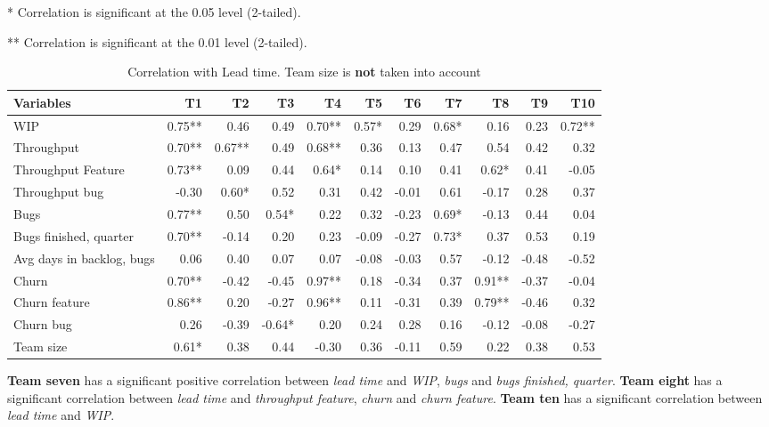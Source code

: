 \documentclass[UKenglish]{ifimaster}  %
\begin{document}
\begin{minipage}[t]{\linewidth}
\begin{table}[H]
 \caption{Correlation with Lead time.  Team size is \textbf{not} taken into account}
 \centerline {* Correlation is significant at the 0.05 level (2-tailed).}
\centerline{** Correlation is significant at the 0.01 level (2-tailed).}
 \begin{adjustwidth}{-1cm}{}
 \centering
 \begin{tabular}{|l|r|r|r|r|r|r|r|r|r|r|}
\hline
 \textbf{Variables} & \bf{T1} & \bf{T2} & \bf{T3} & \bf{T4} & \bf{T5} & \bf{T6} & \bf{T7} & \bf{T8} & \bf{T9} & \bf{T10}\\ \hline
 WIP  & 0.75** & 0.46 & 0.49 & 0.70** & 0.57* & 0.29 & 0.68* & 0.16 & 0.23 & 0.72** \\ \hline
 Throughput  & 0.70** & 0.67** & 0.49 & 0.68** & 0.36 & 0.13 & 0.47 & 0.54 & 0.42 & 0.32 \\ \hline
 Throughput Feature  & 0.73** & 0.09 & 0.44 & 0.64* & 0.14 & 0.10 & 0.41 & 0.62* & 0.41 & -0.05 \\ \hline
 Throughput bug  & -0.30 & 0.60* & 0.52 & 0.31 & 0.42 & -0.01 & 0.61 & -0.17 & 0.28 & 0.37 \\ \hline
 Bugs  & 0.77** & 0.50 & 0.54* & 0.22 & 0.32 & -0.23 & 0.69* & -0.13 & 0.44 & 0.04 \\ \hline
 Bugs finished, quarter  & 0.70** & -0.14 & 0.20 & 0.23 & -0.09 & -0.27 & 0.73* & 0.37 & 0.53 & 0.19 \\ \hline
 Avg days in backlog, bugs  & 0.06 & 0.40 & 0.07 & 0.07 & -0.08 & -0.03 & 0.57 & -0.12 & -0.48 & -0.52 \\ \hline
 Churn  & 0.70** & -0.42 & -0.45 & 0.97** & 0.18 & -0.34 & 0.37 & 0.91** & -0.37 & -0.04 \\ \hline
 Churn feature  & 0.86** & 0.20 & -0.27 & 0.96** & 0.11 & -0.31 & 0.39 & 0.79** & -0.46 & 0.32 \\ \hline
 Churn bug  & 0.26 & -0.39 & -0.64* & 0.20 & 0.24 & 0.28 & 0.16 & -0.12 & -0.08 & -0.27 \\ \hline
 Team size  & 0.61* & 0.38 & 0.44 & -0.30 & 0.36 & -0.11 & 0.59 & 0.22 & 0.38 & 0.53 \\ \hline
\end{tabular}
 \label{corr:lt}

\end{adjustwidth}
\end{table}
\end{minipage}

\textbf{Team seven} has a significant positive correlation between \textit{lead time} and \textit{WIP}, \textit{bugs} and \textit{bugs finished, quarter}. \textbf{Team eight} has a significant correlation between \textit{lead time} and \textit{throughput feature}, \textit{churn} and \textit{churn feature}. \textbf{Team ten} has a significant correlation  between \textit{lead time} and \textit{WIP}.
\end{document}
